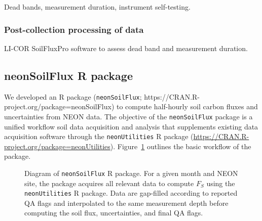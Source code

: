 \documentclass[
  letterpaper,
  DIV=11,
  numbers=noendperiod]{scrartcl}
\begin{document}
Dead bands, measurement duration, instrument self-testing.

\subsubsection{Post-collection processing of
data}\label{post-collection-processing-of-data}

LI-COR SoilFluxPro software to assess dead band and measurement
duration.

\subsection{neonSoilFlux R package}\label{neonsoilflux-r-package}

We developed an R package (\texttt{neonSoilFlux};
https://CRAN.R-project.org/package=neonSoilFlux) to compute half-hourly
soil carbon fluxes and uncertainties from NEON data. The objective of
the \texttt{neonSoilFlux} package is a unified workflow soil data
acquisition and analysis that supplements existing data acquisition
software through the \texttt{neonUtilities} R package
(\url{https://CRAN.R-project.org/package=neonUtilities}).
Figure~\ref{fig-package-diagram} outlines the basic workflow of the
package.

\begin{figure}


\caption{\label{fig-package-diagram}Diagram of \texttt{neonSoilFlux} R
package. For a given month and NEON site, the package acquires all
relevant data to compute \(F_{S}\) using the \texttt{neonUtilities} R
package. Data are gap-filled according to reported QA flags and
interpolated to the same measurement depth before computing the soil
flux, uncertainties, and final QA flags.}

\end{figure}%
\end{document}
